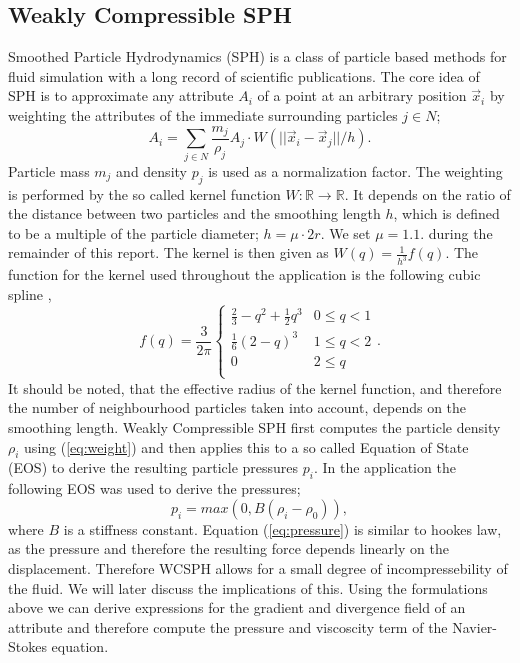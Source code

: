 \documentclass[11pt, letterpaper, twocolumn]{article}
\begin{document}
\subsection{Weakly Compressible SPH}
Smoothed Particle Hydrodynamics (SPH) is a class of particle based methods for fluid simulation with a long record of scientific publications.
The core idea of SPH is to approximate any attribute \( A_i\) of a point at an arbitrary position \(\vec{x}_i\) by weighting the attributes of the immediate surrounding particles \(j \in N \);
\begin{equation}
  A_i = \sum_{j \in N} \frac{m_j}{\rho_j}  A_j \cdot  W(||\vec{x}_i - \vec{x}_j||/h).
  \label{eq:weight}
\end{equation}
Particle mass \(m_j\) and density \(p_j\) is used as a normalization factor.
The weighting is performed by the so called kernel function \( W : \mathbb{R} \rightarrow \mathbb{R}\). It depends on the ratio of the distance between two particles and the smoothing length \(h\), which is defined to be a multiple of the particle diameter; \(h = \mu \cdot 2r\). We set \(\mu = 1.1.\) during the remainder of this report. The kernel is then given as \( W(q) = \frac{1}{h^3}f(q)\).
The function for the kernel used throughout the application is the following cubic spline \cite{monaghan1992},
\begin{equation}
  f(q) = \frac{3}{2\pi}
  \begin{cases}
    \frac{2}{3} - q^2 + \frac{1}{2}q^3 & 0 \leq q < 1 \\
    \frac{1}{6}(2-q)^3 & 1 \leq q < 2 \\
    0 & 2 \leq q \\
  \end{cases}
  .
\end{equation}
It should be noted, that the effective radius of the kernel function, and therefore the number of neighbourhood particles taken into account, depends on the smoothing length.
Weakly Compressible SPH first computes the particle density \(\rho_i\) using (\ref{eq:weight}) and then applies this to a so called Equation of State (EOS) to derive the resulting particle pressures \(p_i\). In the application the following EOS was used to derive the pressures;
\begin{equation}
  p_i = max(0, B(\rho_i - \rho_0)),
  \label{eq:pressure}
\end{equation}
where \(B\) is a stiffness constant. Equation (\ref{eq:pressure}) is similar to hookes law, as the pressure and therefore the resulting force depends linearly on the displacement. Therefore WCSPH allows for a small degree of incompressebility of the fluid. We will later discuss the implications of this. 
Using the formulations above we can derive expressions for the gradient and divergence field of an attribute and therefore compute the pressure and viscoscity term of the Navier-Stokes equation.
\end{document}
